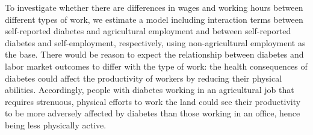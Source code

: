 \documentclass[12pt,english,british]{article}
\begin{document}
To investigate whether there are differences in
wages and working hours between different types of work, we estimate
a model including interaction terms between self-reported diabetes
and agricultural employment and between self-reported diabetes and
self-employment, respectively, using non-agricultural employment as
the base. There would be reason to expect the relationship between
diabetes and labor market outcomes to differ with the type of work:
the health consequences of diabetes could affect the productivity
of workers by reducing their physical abilities. Accordingly, people
with diabetes working in an agricultural job that requires strenuous,
physical efforts to work the land could see their productivity to be
more adversely affected by diabetes than those working in an office,
hence being less physically active. 
\end{document}
